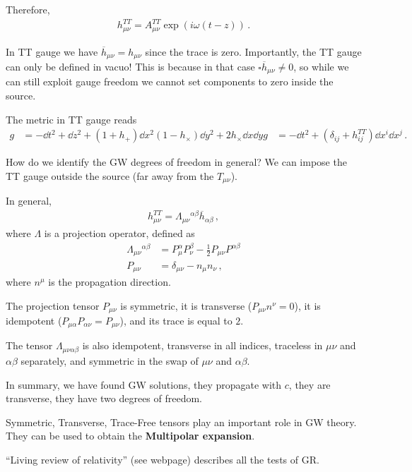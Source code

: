 \documentclass[main.tex]{subfiles}
\begin{document}
Therefore, 
%
\begin{align}
h^{TT}_{\mu \nu } = A_{\mu \nu }^{TT} \exp(i \omega (t - z))
\,.
\end{align}

In TT gauge we have \(\overline{h}_{\mu \nu } = h_{\mu \nu }\) since the trace is zero.
Importantly, the TT gauge can only be defined in vacuo! This is because in that case \(\square \overline{h}_{\mu \nu } \neq 0\), so while we can still exploit gauge freedom we cannot set components to zero inside the source. 

The metric in TT gauge reads 
%
\begin{align}
g &= - \dd{t^2} + \dd{z^2} + (1 + h_+) \dd{x^2} (1 - h_\times ) \dd{y^2} + 2 h_\times \dd{x} \dd{y}
g &= - \dd{t^2} + (\delta_{ij} + h^{TT}_{ij} ) \dd{x^{i}} \dd{x^{j}}
\,.
\end{align}

How do we identify the GW degrees of freedom in general? 
We can impose the TT gauge outside the source (far away from the \(T_{\mu \nu }\)). 

In general, 
%
\begin{align}
h^{TT}_{\mu \nu } = \Lambda_{\mu \nu }{}^{\alpha \beta } \overline{h}_{\alpha \beta }
\,,
\end{align}
%
where \(\Lambda \) is a projection operator, defined as 
%
\begin{align}
\Lambda_{\mu \nu }{}^{\alpha \beta } &= P_{\mu }^{\alpha } P_\nu^{\beta } - \frac{1}{2} P_{\mu \nu } P^{\alpha \beta }  \\
P_{\mu \nu } &= \delta_{\mu \nu } - n_\mu n_\nu 
\,,
\end{align}
%
where \(n^\mu \) is the propagation direction. 

The projection tensor \(P_{\mu \nu }\) is symmetric, it is transverse (\(P_{\mu \nu } n^{\nu } = 0\)), it is idempotent (\(P_{\mu \alpha } P_{\alpha \nu } = P_{\mu \nu }\)), and its trace is equal to \(2\). 

The tensor \(\Lambda_{\mu \nu \alpha \beta } \) is also idempotent, transverse in all indices, traceless in \(\mu \nu \) and \(\alpha \beta \) separately, and symmetric in the swap of \(\mu \nu \) and \(\alpha \beta \). 

In summary, we have found GW solutions, they propagate with \(c\), they are transverse, they have two degrees of freedom. 

Symmetric, Transverse, Trace-Free tensors play an important role in GW theory. They can be used to obtain the \textbf{Multipolar expansion}. 

``Living review of relativity'' (see webpage) describes all the tests of GR. 
\end{document}
